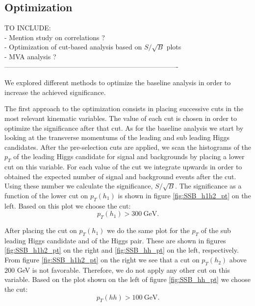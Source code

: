 \subsection{Optimization}

TO INCLUDE:\\
- Mention study on correlations ? \\
- Optimization of cut-based analysis based on $S/\sqrt{B}$ plots \\
- MVA analysis ? \\
----------------------------------------------------------------------------

We explored different methods to optimize the baseline analysis in order to increase the achieved significance. 

The first approach to the optimization consists in placing successive cuts in the most relevant kinematic variables. The value of each cut is chosen in order to optimize the significance after that cut. As for the baseline analysis we start by looking at the transverse momentums of the leading and sub leading Higgs candidates. After the pre-selection cuts are applied, we scan the histograms of the $p_T$ of the leading Higgs candidate for signal and backgrounds by placing a lower cut on this variable. For each value of the cut we integrate upwards in order to obtained the expected number of signal and background events after the cut. Using these number we calculate the significance, $S/\sqrt{B}$. The significance as a function of the lower cut on $p_T(h_1)$ is shown in figure \ref{fig:SSB_h1h2_pt} on the left. Based on this plot we choose the cut:	
\begin{equation}
	p_T(h_1)>300~\text{GeV}.
\end{equation}

After placing the cut on $p_T(h_1)$ we do the same plot for the $p_T$ of the sub leading Higgs candidate and of the Higgs pair. These are shown in figures \ref{fig:SSB_h1h2_pt} on the right and \ref{fig:SSB_hh_pt} on the left, respectively. From figure \ref{fig:SSB_h1h2_pt} on the right we see that a cut on $p_T(h_2)$ above $200$ GeV is not favorable. Therefore, we do not apply any other cut on this variable. Based on the plot shown on the left of figure \ref{fig:SSB_hh_pt} we choose the cut:
\begin{equation}
	p_T(hh)>100~\text{GeV}.
\end{equation}

